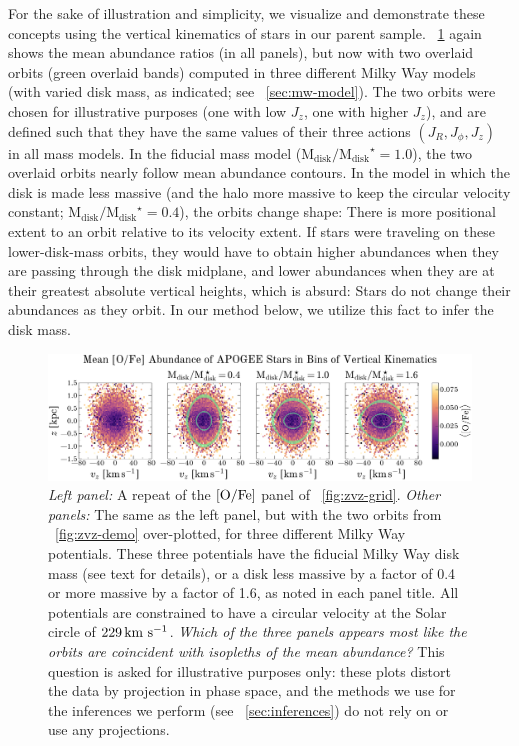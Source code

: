 \documentclass[modern]{aastex63}
\newcommand{\ofe}{\abunratio{O}{Fe}}
\newcommand{\mdisk}{\ensuremath{\mathrm{M}_\mathrm{disk}}}
\newcommand{\mratio}{\ensuremath{\mdisk / \mdisk^\star}}
\begin{document}
For the sake of illustration and simplicity, we visualize and demonstrate these
concepts using the vertical kinematics of stars in our parent sample.
\figurename~\ref{fig:zvz-ofe} again shows the mean  abundance
ratios (in all panels), but now with two overlaid orbits (green overlaid bands)
computed in three different Milky Way models (with varied disk mass, as
indicated; see \sectionname~\ref{sec:mw-model}).
The two orbits were chosen for illustrative purposes (one with low $J_z$, one
with higher $J_z$), and are defined such that they have the same values of their
three actions $(J_R, J_\phi, J_z)$ in all mass models.
In the fiducial mass model ($\mratio = 1.0$), the two overlaid orbits nearly
follow mean abundance contours.
In the model in which the disk is made less massive (and the halo more massive
to keep the circular velocity constant; $\mratio = 0.4$), the orbits change
shape:
There is more positional extent to an orbit relative to its velocity extent.
If stars were traveling on these lower-disk-mass orbits, they would have to
obtain higher abundances when they are passing through the disk midplane,
and lower abundances when they are at their greatest absolute vertical heights,
which is absurd: Stars do not change their abundances as they orbit.
In our method below, we utilize this fact to infer the disk mass.


\begin{figure}[!tp]
  \begin{mdframed}
    \color{captiongray}
  \begin{center}
  \includegraphics[width=\textwidth]{zvz-mean-O_FE}
  \end{center}
  \caption{%
    \textsl{Left panel:} A repeat of the $\ofe$ panel of
    \figurename~\ref{fig:zvz-grid}.
    \textsl{Other panels:} The same as the left panel, but with the two orbits
    from \figurename~\ref{fig:zvz-demo} over-plotted, for three different Milky
    Way potentials.
    These three potentials have the fiducial Milky Way disk mass (see text
    for details), or a disk less massive by a factor of 0.4 or more
    massive by a factor of 1.6, as noted in each panel title.
    All potentials are constrained to have a circular velocity at the
    Solar circle of $229\,\mathrm{km}~\mathrm{s}^{-1}$.
    \emph{Which of the three panels appears most like the orbits are
    coincident with isopleths of the mean abundance?}
    This question is asked for illustrative purposes only: these plots distort
    the data by projection in phase space, and the methods we use for the
    inferences we perform (see \sectionname~\ref{sec:inferences}) do not rely
    on or use any projections.
  \label{fig:zvz-ofe}
  }
  \end{mdframed}
\end{figure}
\end{document}
